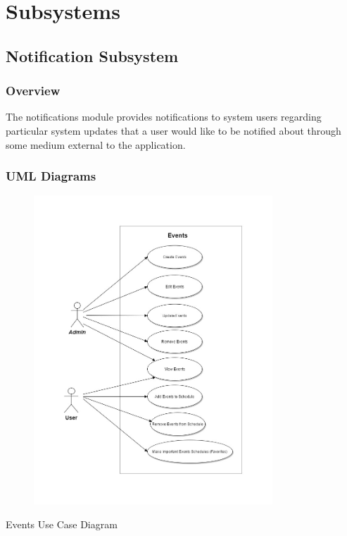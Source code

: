 \documentclass{article}
\begin{document}
    \section{Subsystems}
    
    \subsection{Notification Subsystem}
    
    \subsubsection{Overview}
    
    The notifications module provides notifications to system users regarding
    particular system updates that a user would like to be notified about through
    some medium external to the application.
    
    \subsubsection{UML Diagrams}
    
    \begin{figure}[h!]
        \includegraphics[width=0.8\textwidth]{Images/EventUC.jpg}
    \end{figure}
    Events Use Case Diagram
    
\end{document}
